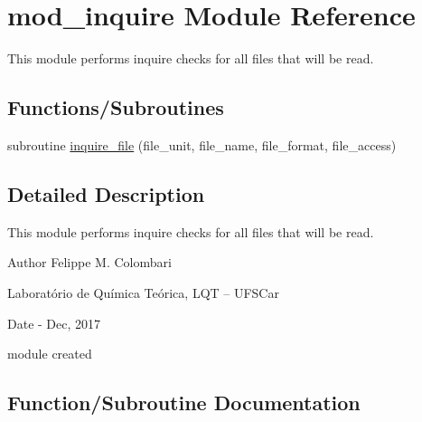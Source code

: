 \hypertarget{namespacemod__inquire}{}\section{mod\+\_\+inquire Module Reference}
\label{namespacemod__inquire}


This module performs inquire checks for all files that will be read.  


\subsection*{Functions/\+Subroutines}
\begin{DoxyCompactItemize}
\item 
subroutine \hyperlink{namespacemod__inquire_a175fbc61cabe72b93b4f110e72d566c3}{inquire\+\_\+file} (file\+\_\+unit, file\+\_\+name, file\+\_\+format, file\+\_\+access)
\end{DoxyCompactItemize}


\subsection{Detailed Description}
This module performs inquire checks for all files that will be read. 

\begin{DoxyAuthor}{Author}
Felippe M. Colombari
\begin{DoxyItemize}
\item Laboratório de Química Teórica, L\+QT -- U\+F\+S\+Car 
\end{DoxyItemize}
\end{DoxyAuthor}
\begin{DoxyDate}{Date}
-\/ Dec, 2017
\begin{DoxyItemize}
\item module created 
\end{DoxyItemize}
\end{DoxyDate}


\subsection{Function/\+Subroutine Documentation}
\mbox{\label{namespacemod__inquire_a175fbc61cabe72b93b4f110e72d566c3}} 
